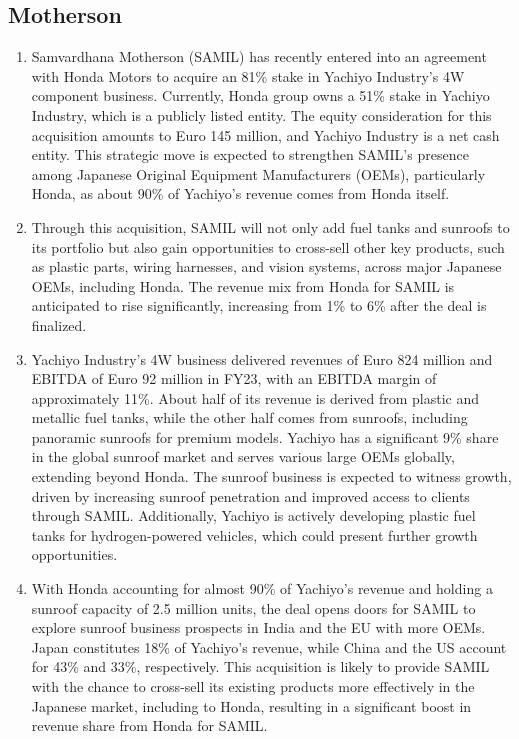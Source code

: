 \subsection{Motherson}

\begin{enumerate}

	\item Samvardhana Motherson (SAMIL) has recently entered into an agreement with Honda Motors to acquire an 81\% stake in Yachiyo Industry's 4W component business. Currently, Honda group owns a 51\% stake in Yachiyo Industry, which is a publicly listed entity. The equity consideration for this acquisition amounts to Euro 145 million, and Yachiyo Industry is a net cash entity. This strategic move is expected to strengthen SAMIL's presence among Japanese Original Equipment Manufacturers (OEMs), particularly Honda, as about 90\% of Yachiyo's revenue comes from Honda itself.

\item Through this acquisition, SAMIL will not only add fuel tanks and sunroofs to its portfolio but also gain opportunities to cross-sell other key products, such as plastic parts, wiring harnesses, and vision systems, across major Japanese OEMs, including Honda. The revenue mix from Honda for SAMIL is anticipated to rise significantly, increasing from 1\% to 6\% after the deal is finalized.

\item Yachiyo Industry's 4W business delivered revenues of Euro 824 million and EBITDA of Euro 92 million in FY23, with an EBITDA margin of approximately 11\%. About half of its revenue is derived from plastic and metallic fuel tanks, while the other half comes from sunroofs, including panoramic sunroofs for premium models. Yachiyo has a significant 9\% share in the global sunroof market and serves various large OEMs globally, extending beyond Honda. The sunroof business is expected to witness growth, driven by increasing sunroof penetration and improved access to clients through SAMIL. Additionally, Yachiyo is actively developing plastic fuel tanks for hydrogen-powered vehicles, which could present further growth opportunities.

\item With Honda accounting for almost 90\% of Yachiyo's revenue and holding a sunroof capacity of 2.5 million units, the deal opens doors for SAMIL to explore sunroof business prospects in India and the EU with more OEMs. Japan constitutes 18\% of Yachiyo's revenue, while China and the US account for 43\% and 33\%, respectively. This acquisition is likely to provide SAMIL with the chance to cross-sell its existing products more effectively in the Japanese market, including to Honda, resulting in a significant boost in revenue share from Honda for SAMIL.


\end{enumerate}
